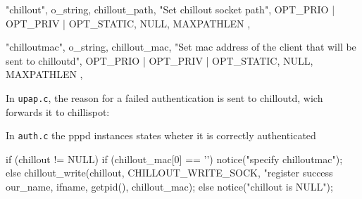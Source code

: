 \begintt
    { "chillout", o_string, chillout_path,
      "Set chillout socket path",
      OPT_PRIO | OPT_PRIV | OPT_STATIC, NULL, MAXPATHLEN },

    { "chilloutmac", o_string, chillout_mac,
      "Set mac address of the client that will be sent to chilloutd",
      OPT_PRIO | OPT_PRIV | OPT_STATIC, NULL, MAXPATHLEN },
\endtt

In {\tt upap.c}, the reason for a failed authentication is sent to
chilloutd, wich forwards it to chillispot:

\begintt
\endtt

In {\tt auth.c} the pppd instances states wheter it is correctly authenticated

\begintt
    if (chillout != NULL) {
       if (chillout_mac[0] == '\0') {
               notice("specify chilloutmac");
       } else {
               chillout_write(chillout, CHILLOUT_WRITE_SOCK, "register success %
                               our_name, ifname, getpid(), chillout_mac);
       }
    } else {
       notice("chillout is NULL");
    }
\endtt 


%
%
%
%
%
%
%
%

